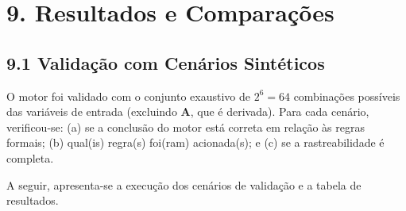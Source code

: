 \documentclass[11pt]{article}
\begin{document}
    \section{9. Resultados e
Comparações}\label{resultados-e-comparauxe7uxf5es}

\subsection{9.1 Validação com Cenários
Sintéticos}\label{validauxe7uxe3o-com-cenuxe1rios-sintuxe9ticos}

O motor foi validado com o conjunto exaustivo de \(2^6 = 64\)
combinações possíveis das variáveis de entrada (excluindo \textbf{A},
que é derivada). Para cada cenário, verificou-se: (a) se a conclusão do
motor está correta em relação às regras formais; (b) qual(is) regra(s)
foi(ram) acionada(s); e (c) se a rastreabilidade é completa.

A seguir, apresenta-se a execução dos cenários de validação e a tabela
de resultados.
\end{document}
